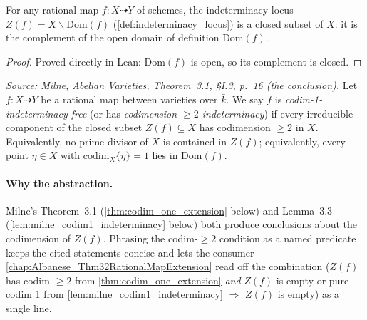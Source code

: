 \begin{lemma}
  \label{lem:isClosed_indeterminacy_locus}
  For any rational map \(f \colon X \dashrightarrow Y\) of schemes, the
  indeterminacy locus \(Z(f) = X \smallsetminus \mathrm{Dom}(f)\)
  (\cref{def:indeterminacy_locus}) is a closed subset of \(X\): it is the
  complement of the open domain of definition \(\mathrm{Dom}(f)\).
\end{lemma}

\begin{proof}
  Proved directly in Lean: \(\mathrm{Dom}(f)\) is open, so its complement is closed.
\end{proof}

\begin{definition}


  \label{def:codim_one_indeterminacy}
  \textit{Source: Milne, \emph{Abelian Varieties}, Theorem~3.1, \S I.3, p.~16 (the
  conclusion).}
  Let \(f \colon X \dashrightarrow Y\) be a rational map between varieties over \(\bar k\).
  We say \(f\) is \emph{codim-1-indeterminacy-free} (or has \emph{codimension-\(\geq 2\)
  indeterminacy}) if every irreducible component of the closed subset \(Z(f) \subseteq X\)
  has codimension \(\geq 2\) in \(X\). Equivalently, no prime divisor of \(X\) is contained in
  \(Z(f)\); equivalently, every point \(\eta \in X\) with \(\mathrm{codim}_X \overline{\{\eta\}} = 1\)
  lies in \(\mathrm{Dom}(f)\).

  \paragraph{Why the abstraction.} Milne's Theorem~3.1 (\cref{thm:codim_one_extension}
  below) and Lemma~3.3 (\cref{lem:milne_codim1_indeterminacy} below) both produce
  conclusions about the codimension of \(Z(f)\). Phrasing the codim-\(\geq 2\) condition
  as a named predicate keeps the cited statements concise and lets the consumer
  \cref{chap:Albanese_Thm32RationalMapExtension} read off the combination
  (\(Z(f)\) has codim \(\geq 2\) from \cref{thm:codim_one_extension} \emph{and} \(Z(f)\) is
  empty or pure codim 1 from \cref{lem:milne_codim1_indeterminacy} \(\Rightarrow\) \(Z(f)\)
  is empty) as a single line.


\end{definition}
